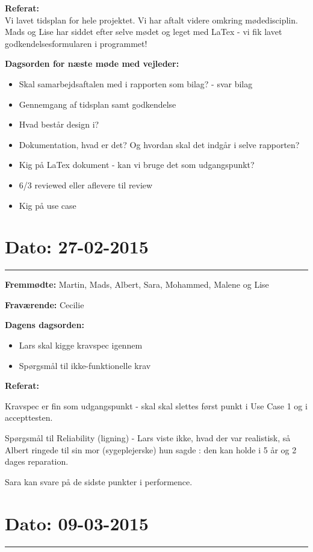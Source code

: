 \textbf{Referat:}\\ 
Vi lavet tidsplan for hele projektet. Vi har aftalt videre omkring mødedisciplin. Mads og Lise har siddet efter selve mødet og leget med LaTex - vi fik lavet godkendelsesformularen i programmet! 

\textbf{Dagsorden for næste møde med vejleder:}
\begin{itemize}

	\item Skal samarbejdsaftalen med i rapporten som bilag? - svar bilag
	\item Gennemgang af tidsplan samt godkendelse 
	\item Hvad består design i? 
	\item Dokumentation, hvad er det? Og hvordan skal det indgår i selve rapporten? 
	\item Kig på LaTex dokument - kan vi bruge det som udgangspunkt?
	\item 6/3 reviewed eller aflevere til review
	\item Kig på use case
 
\end{itemize}

\section{Dato: 27-02-2015}
\hrule

\textbf{Fremmødte:} Martin, Mads, Albert, Sara, Mohammed, Malene og Lise 

\textbf{Fraværende:} Cecilie

\textbf{Dagens dagsorden:}
\begin{itemize}
	\item Lars skal kigge kravspec igennem
	\item Spørgsmål til ikke-funktionelle krav
\end{itemize}

\textbf{Referat:}

Kravspec er fin som udgangspunkt - skal skal slettes først punkt i Use Case 1 og i accepttesten. 

Spørgsmål til Reliability (ligning) - Lars viste ikke, hvad der var realistisk, så Albert ringede til sin mor (sygeplejerske) hun sagde : den kan holde i 5 år og 2 dages reparation.

Sara kan svare på de sidste punkter i performence.    

\section{Dato: 09-03-2015}
\hrule

